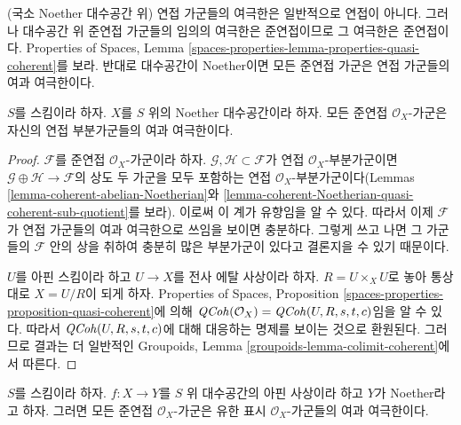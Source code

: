 \noindent
(국소 Noether 대수공간 위) 연접 가군들의 여극한은 일반적으로 연접이
아니다. 그러나 대수공간 위 준연접 가군들의 임의의 여극한은 준연접이므로
그 여극한은 준연접이다. Properties of Spaces, Lemma
\ref{spaces-properties-lemma-properties-quasi-coherent}를 보라. 반대로
대수공간이 Noether이면 모든 준연접 가군은 연접 가군들의 여과 여극한이다.

\begin{lemma}
\label{lemma-directed-colimit-coherent}
$S$를 스킴이라 하자. $X$를 $S$ 위의 Noether 대수공간이라 하자.
모든 준연접 $\mathcal{O}_X$-가군은 자신의 연접 부분가군들의 여과
여극한이다.
\end{lemma}

\begin{proof}
$\mathcal{F}$를 준연접 $\mathcal{O}_X$-가군이라 하자.
$\mathcal{G}, \mathcal{H} \subset \mathcal{F}$가 연접
$\mathcal{O}_X$-부분가군이면
$\mathcal{G} \oplus \mathcal{H} \to \mathcal{F}$의 상도 두 가군을
모두 포함하는 연접 $\mathcal{O}_X$-부분가군이다(Lemmas
\ref{lemma-coherent-abelian-Noetherian}와
\ref{lemma-coherent-Noetherian-quasi-coherent-sub-quotient}를 보라).
이로써 이 계가 유향임을 알 수 있다. 따라서 이제 $\mathcal{F}$가
연접 가군들의 여과 여극한으로 쓰임을 보이면 충분하다. 그렇게 쓰고 나면
그 가군들의 $\mathcal{F}$ 안의 상을 취하여 충분히 많은 부분가군이
있다고 결론지을 수 있기 때문이다.

\medskip\noindent
$U$를 아핀 스킴이라 하고 $U \to X$를 전사 에탈 사상이라 하자.
$R = U \times_X U$로 놓아 통상대로 $X = U/R$이 되게 하자.
Properties of Spaces, Proposition
\ref{spaces-properties-proposition-quasi-coherent}에 의해
$\mathit{QCoh}(\mathcal{O}_X) = \mathit{QCoh}(U, R, s, t, c)$임을 알 수 있다.
따라서 $\mathit{QCoh}(U, R, s, t, c)$에 대해 대응하는 명제를 보이는 것으로
환원된다. 그러므로 결과는 더 일반적인 Groupoids, Lemma
\ref{groupoids-lemma-colimit-coherent}에서 따른다.
\end{proof}

\begin{lemma}
\label{lemma-direct-colimit-finite-presentation}
$S$를 스킴이라 하자. $f : X \to Y$를 $S$ 위 대수공간의 아핀
사상이라 하고 $Y$가 Noether라고 하자. 그러면 모든 준연접
$\mathcal{O}_X$-가군은 유한 표시 $\mathcal{O}_X$-가군들의 여과
여극한이다.
\end{lemma}

